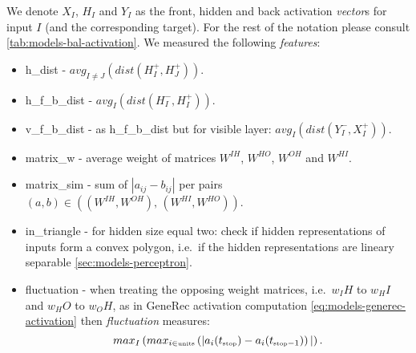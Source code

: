We denote $X_I$, $H_I$ and $Y_I$ as the front, hidden and back activation \emph{vector}s for input $I$ (and the corresponding target). For the rest of the notation please consult \ref{tab:models-bal-activation}. We measured the following \emph{features}: 
\begin{itemize} 
\item h\_dist - $avg_{I \neq J}\left(dist(H_I^{+},H_J^{+})\right)$.
\item h\_f\_b\_dist - $avg_{I}\left(dist(H_I^{-},H_I^{+})\right)$.
\item	v\_f\_b\_dist - as h\_f\_b\_dist but for visible layer: $avg_{I}\left(dist(Y_I^{-},X_I^{+})\right)$. 
\item matrix\_w - average weight of matrices $W^{IH}$, $W^{HO}$, $W^{OH}$ and $W^{HI}$. 
\item matrix\_sim - sum of $|a_{ij} - b_{ij}|$ per pairs $(a,b) \in ((W^{IH}, W^{OH}),\, (W^{HI}, W^{HO}))$. 
\item \label{sec:our-in-triangle} in\_triangle - for hidden size equal two: check if hidden representations of inputs form a convex polygon, i.e.~if the hidden representations are lineary separable \ref{sec:models-perceptron}. 
\item fluctuation - when treating the opposing weight matrices, i.e.~$w_IH$ to $w_HI$ and $w_HO$ to $w_OH$, as in GeneRec activation computation \ref{eq:models-generec-activation} then \emph{fluctuation} measures:
\begin{equation}
  \label{eq:our-fluctuation}
  max_{I}\left(
    max_{i \in \mbox{\tiny units}}\left(
      |a_i(t_{\mbox{\tiny stop}}) - a_i(t_{\mbox{\tiny stop}-1})
    \right)|
  \right). 
\end{equation}



\end{itemize} 

